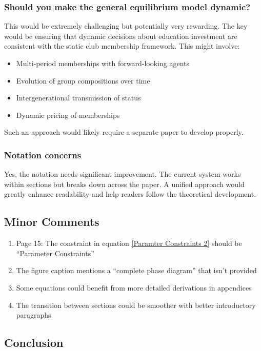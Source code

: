 \documentclass[12pt,letterpaper]{article}
\begin{document}
\subsubsection{Should you make the general equilibrium model dynamic?}

This would be extremely challenging but potentially very rewarding. The key would be ensuring that dynamic decisions about education investment are consistent with the static club membership framework. This might involve:

\begin{itemize}
	\item Multi-period memberships with forward-looking agents
	\item Evolution of group compositions over time
	\item Intergenerational transmission of status
	\item Dynamic pricing of memberships
\end{itemize}

Such an approach would likely require a separate paper to develop properly.

\subsubsection{Notation concerns}

Yes, the notation needs significant improvement. The current system works within sections but breaks down across the paper. A unified approach would greatly enhance readability and help readers follow the theoretical development.

\subsection{Minor Comments}

\begin{enumerate}
	\item Page 15: The constraint in equation \eqref{Paramter Constraints 2} should be ``Parameter Constraints''
	\item The figure caption mentions a ``complete phase diagram'' that isn't provided
	\item Some equations could benefit from more detailed derivations in appendices
	\item The transition between sections could be smoother with better introductory paragraphs
\end{enumerate}

\subsection{Conclusion}
\end{document}
